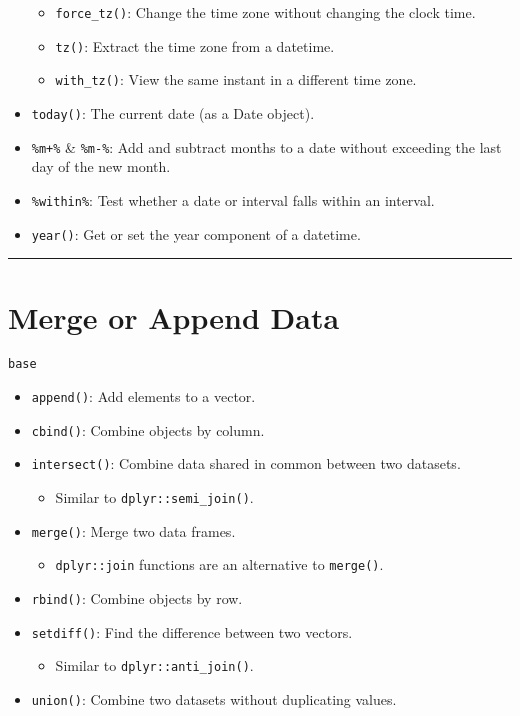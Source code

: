 \documentclass[]{book}
\providecommand{\tightlist}{%
  \setlength{\itemsep}{0pt}\setlength{\parskip}{0pt}}
\theoremstyle{definition}
\theoremstyle{definition}
\theoremstyle{definition}
\theoremstyle{remark}
\begin{document}
\begin{itemize}
  \begin{itemize}
  \tightlist
  \item
    \texttt{force\_tz()}: Change the time zone without changing the
    clock time.
  \item
    \texttt{tz()}: Extract the time zone from a datetime.
  \item
    \texttt{with\_tz()}: View the same instant in a different time zone.
  \end{itemize}
\item
  \texttt{today()}: The current date (as a Date object).
\item
  \texttt{\%m+\%} \& \texttt{\%m-\%}: Add and subtract months to a date
  without exceeding the last day of the new month.
\item
  \texttt{\%within\%}: Test whether a date or interval falls within an
  interval.
\item
  \texttt{year()}: Get or set the year component of a datetime.
\end{itemize}

\begin{center}\rule{0.5\linewidth}{\linethickness}\end{center}

\section{Merge or Append Data}\label{merge-or-append-data}

\texttt{base}

\begin{itemize}
\tightlist
\item
  \texttt{append()}: Add elements to a vector.
\item
  \texttt{cbind()}: Combine objects by column.
\item
  \texttt{intersect()}: Combine data shared in common between two
  datasets.

  \begin{itemize}
  \tightlist
  \item
    Similar to \texttt{dplyr::semi\_join()}.
  \end{itemize}
\item
  \texttt{merge()}: Merge two data frames.

  \begin{itemize}
  \tightlist
  \item
    \texttt{dplyr::join} functions are an alternative to
    \texttt{merge()}.
  \end{itemize}
\item
  \texttt{rbind()}: Combine objects by row.
\item
  \texttt{setdiff()}: Find the difference between two vectors.

  \begin{itemize}
  \tightlist
  \item
    Similar to \texttt{dplyr::anti\_join()}.
  \end{itemize}
\item
  \texttt{union()}: Combine two datasets without duplicating values.
\end{itemize}
\end{document}
